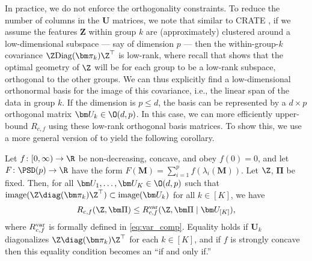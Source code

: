 \documentclass[../../book-main.tex]{subfiles}
\begin{document}
In practice, we do not enforce the orthogonality constraints. To reduce the number of columns in the $\bm U$ matrices, we note that similar to CRATE \citep{yu2023white}, if we assume the features $\bm Z$ within group \(k\) are (approximately) clustered around a low-dimensional subspace --- say of dimension \(p\) --- then the within-group-\(k\) covariance \(\Z\mathrm{Diag}(\bm \pi_{k})\Z^{\top}\) is low-rank, where recall that \cite{yu2020learning} shows that the optimal geometry of $\Z$ will be for each group to be a low-rank subspace, orthogonal to the other groups. We can thus explicitly find a low-dimensional orthonormal basis for the image of this covariance, i.e., the linear span of the data in group \(k\). If the dimension is $p \leq d$, the basis can be represented by a $d\times p$ orthogonal matrix $\bm U_k \in \O(d, p)$. In this case, we can more efficiently upper-bound \(R_{c,f}\) using these low-rank orthogonal basis matrices. To show this, we use a more general version of   to yield the following corollary.
\begin{corollary}\label{cor:var_concave_logdet}
    Let \(f \colon [0, \infty) \to \R\) be non-decreasing, concave, and obey \(f(0) = 0\), and let \(F \colon \PSD(p) \to \R\) have the form \(F(\bm M) = \sum_{i = 1}^{p}f(\lambda_{i}(\bm M))\). Let \(\Z\), \(\bm \Pi\) be fixed. Then, for all \(\bm U_{1}, \dots, \bm U_{K} \in \O(d, p)\) such that \(\mathrm{image}(\Z\diag(\bm \pi_{k})\Z^{\top}) \subset \mathrm{image}(\bm U_{k})\) for all \(k \in [K]\), we have
    \begin{equation}
        R_{c, f}(\Z, \bm\Pi) \leq R_{c, f}^{\rm var}(\Z, \bm\Pi \mid \bm U_{[K]}), 
    \end{equation}
     where \(R_{c, f}^{\rm var}\) is formally defined in \eqref{eq:var_comp}. Equality holds if \(\bm U_{k}\) diagonalizes \(\Z\diag(\bm \pi_{k})\Z^{\top}\) for each \(k \in [K]\), and if \(f\) is strongly concave then this equality condition becomes an ``if and only if.''
\end{corollary}
\end{document}
